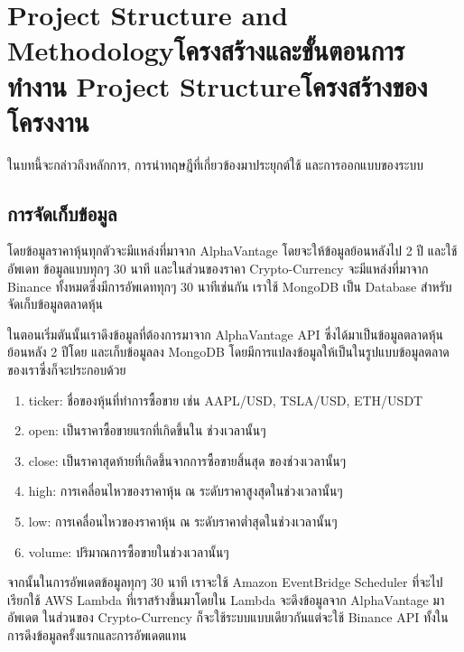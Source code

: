 \chapter{\ifproject%
\ifenglish Project Structure and Methodology\else โครงสร้างและขั้นตอนการทำงาน\fi
\else%
\ifenglish Project Structure\else โครงสร้างของโครงงาน\fi
\fi
}

ในบทนี้จะกล่าวถึงหลักการ, การนำทฤษฎีที่เกี่ยวข้องมาประยุกต์ใช้ และการออกแบบของระบบ

\makeatletter


\makeatother

\section{การจัดเก็บข้อมูล}
โดยข้อมูลราคาหุ้นทุกตัวจะมีแหล่งที่มาจาก AlphaVantage โดยจะให้ข้อมูลย้อนหลังไป 2 ปี และใช้อัพเดท
ข้อมูลแบบทุกๆ 30 นาที และในส่วนของราคา Crypto-Currency จะมีแหล่งที่มาจาก Binance ทั้งหมดซึ่งมีการอัพเดททุกๆ 30 นาทีเช่นกัน
เราใช้ MongoDB เป็น Database สำหรับจัดเก็บข้อมูลตลาดหุ้น

ในตอนเริ่มตันนั้นเราดึงข้อมูลที่ต้องการมาจาก AlphaVantage API ซึ่งได้มาเป็นข้อมูลตลาดหุ้นย้อนหลัง 2 ปีโดย
และเก็บข้อมูลลง MongoDB โดยมีการแปลงข้อมูลให้เป็นในรูปแบบข้อมูลตลาดของเราซึ่งก็จะประกอบด้วย
\begin{enumerate}
    \item ticker: ชื่อของหุ้นที่ทำการซื้อขาย เช่น AAPL/USD, TSLA/USD, ETH/USDT
    \item open: เป็นราคาซื้อขายแรกที่เกิดขึ้นใน ช่วงเวลานั้นๆ
    \item close: เป็นราคาสุดท้ายที่เกิดขึ้นจากการซื้อขายสิ้นสุด ของช่วงเวลานั้นๆ
    \item high: การเคลื่อนไหวของราคาหุ้น ณ ระดับราคาสูงสุดในช่วงเวลานั้นๆ
    \item low: การเคลื่อนไหวของราคาหุ้น ณ ระดับราคาต่ำสุดในช่วงเวลานั้นๆ
    \item volume: ปริมาณการซื้อขายในช่วงเวลานั้นๆ
\end{enumerate}
จากนั้นในการอัพเดตข้อมูลทุกๆ 30 นาที เราจะใช้ Amazon EventBridge Scheduler ที่จะไปเรียกใช้ AWS Lambda ที่เราสร้างขึ้นมาโดยใน Lambda จะดึงข้อมูลจาก 
AlphaVantage มาอัพเดต ในส่วนของ Crypto-Currency ก็จะใช้ระบบแบบเดียวกันแต่จะใช้ Binance API ทั้งในการดึงข้อมูลครั้งแรกและการอัพเดตแทน

